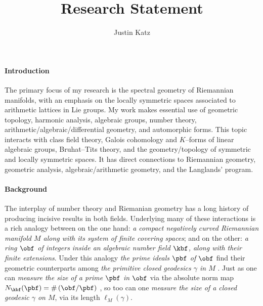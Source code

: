 \documentclass[11pt]{article}
\title{Research Statement}
\date{}
\author{Justin Katz}
\begin{document}
 
\begin{comment}
	This is a concise summary of the research you’ve
	done so far and what you plan to do in the next few years. The total length is
	usually on the order of 5 pages. 
	
	The basic rule here is to keep it straightforward –
	it will probably be read by someone who is not an expert in your particular field,
	and who has hundreds of applications to get through. 
	
	It’s thus more important
	to indicate clearly how your research accomplishments and goals fit into the broad
	scheme of things, than to give all the technical details. 
	
	Try to format the research
	statement so that it can be easily skimmed: for example, you might put the most
	important problems and your most important results in bold. 	
\end{comment}

	\maketitle
	\paragraph{Introduction}\label{intro} The primary focus of my research is the spectral geometry of Riemannian manifolds, with an emphasis on the locally symmetric spaces associated to arithmetic lattices in Lie groups. My work makes essential use of geometric topology, harmonic analysis, algebraic groups, number theory, arithmetic/algebraic/differential geometry, and automorphic  forms. This topic interacts with class field theory, Galois cohomology and $K–$forms of linear algebraic groups, Bruhat–Tits theory, and the geometry/topology of symmetric and locally symmetric spaces. It has direct connections to Riemannian geometry, geometric analysis, algebraic/arithmetic geometry, and the Langlands’ program.
	
	\paragraph{Background}\label{bg}The interplay of number theory and Riemanian geometry has a long history of producing incisive results in both fields. Underlying many of these interactions is a rich analogy between on the one hand: \emph{a compact negatively curved Riemannian manifold $M$ along with its system of finite covering spaces}; and on the other:  \emph{a ring  $\obf$ of integers inside an algebraic number field $\kbf$, along with their finite extensions}. Under this analogy \emph{the prime ideals $\pbf$ of $\obf$ } find their geometric counterparts among \emph{the primitive closed geodesics $\gamma$ in $M$} .  Just as one can \emph{measure  the size of a prime $\pbf$ in $\obf$} via the absolute norm map $N_\kbf(\pbf) =\# \left(\obf /\pbf\right) $ , so too can one \emph{measure the  size of a closed geodesic $\gamma$  on $M$}, via its length $\ell_M(\gamma)$.
	
\end{document}
